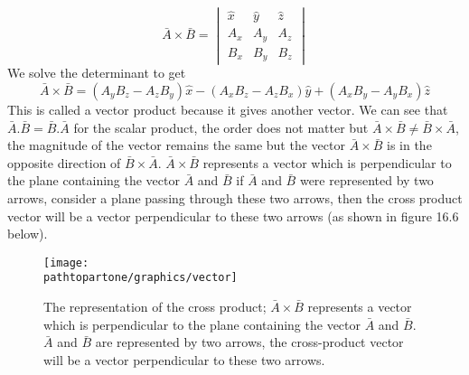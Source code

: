 \begin{dmath*}
\bar{A} \times \bar{B} = 
\begin{vmatrix}
\hat{x} & \hat{y} & \hat{z}\\
A_{x} & A_{y} & A_{z} \\
B_{x} & B_{y} & B_{z} 
\end{vmatrix}
\end{dmath*}
We solve the determinant to get 
\begin{dmath}
\bar{A} \times \bar{B} = (A_{y}B_{z} - A_{z}B_{y})\hat{x} - (A_{x}B_{z} - A_{z}B_{x})\hat{y} + (A_{x}B_{y} - A_{y}B_{x})\hat{z}
\end{dmath}
This is called a vector product because it gives another vector. We can see that $\bar{A}.\bar{B} = \bar{B}.\bar{A} $ for the scalar product, the order does not matter but $\bar{A} \times \bar{B} \neq \bar{B} \times \bar{A}$, the magnitude of the vector remains the same but the vector $\bar{A} \times \bar{B}$ is in the opposite direction of $\bar{B} \times \bar{A}$. $\bar{A} \times \bar{B}$ represents a vector which is perpendicular to the plane containing the vector $\bar{A}$ and $\bar{B}$ if $\bar{A}$ and $\bar{B}$ were represented by two arrows, consider a plane passing through these two arrows, then the cross product vector will be a vector perpendicular to these two arrows (as shown in figure 16.6 below).

\begin{figure}[h]
\centering
\texttt{[image: \\pathtopartone/graphics/vector]}
\caption{The representation of the cross product; $\bar{A} \times \bar{B}$ represents a vector which is perpendicular to the plane containing the vector $\bar{A}$ and $\bar{B}$. $\bar{A}$ and $\bar{B}$ are represented by two arrows, the cross-product vector will be a vector perpendicular to these two arrows.}
\end{figure}

